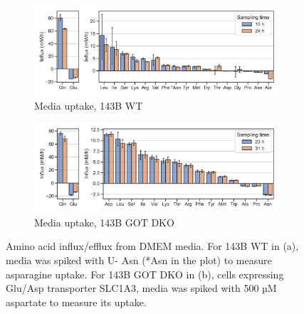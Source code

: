 \begin{figure}
     \centering
     \begin{subfigure}[b]{0.75\textwidth}
         \centering
         \includegraphics[width=\textwidth]{figures/chap2/flux_143wt.pdf}
         \caption{Media uptake, 143B WT}
         \label{fig:ch2:flux_143wt}
     \end{subfigure}
     \begin{subfigure}[b]{0.75\textwidth}
         \centering
         \includegraphics[width=\textwidth]{figures/chap2/flux_143dko.pdf}
         \caption{Media uptake, 143B GOT DKO}
         \label{fig:ch2:flux_143dko}
     \end{subfigure}
        \caption[Media amino acid uptake.]{
        Amino acid influx/efflux from DMEM media.
        For 143B WT in (a), media was spiked with U-\hCi{} Asn (*Asn in the plot) to measure asparagine uptake.
        For 143B GOT DKO in (b), cells expressing Glu/Asp transporter SLC1A3, media was spiked with 500 µM aspartate to measure its uptake.
        }
        \label{fig:ch2:flux_143wt_dko}
\end{figure}

